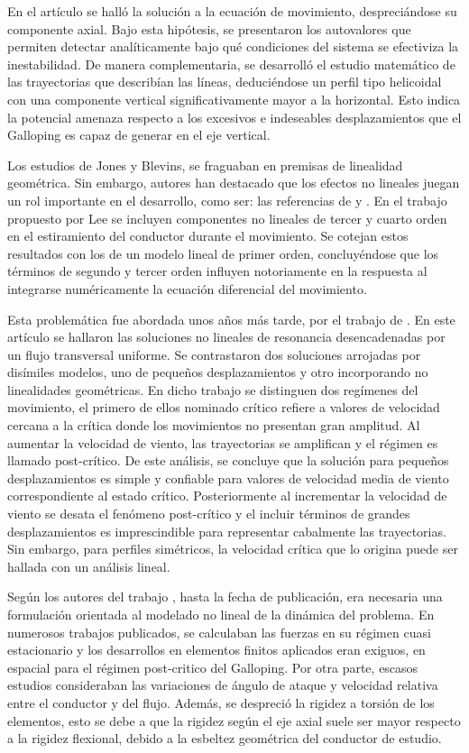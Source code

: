 En el artículo \citep{jones1992coupled} se halló la solución a la ecuación de movimiento, despreciándose su componente axial. Bajo esta hipótesis, se presentaron los autovalores que permiten detectar analíticamente bajo qué condiciones del sistema se efectiviza la inestabilidad. De manera complementaria, se desarrolló el estudio matemático de las trayectorias que describían las líneas, deduciéndose un perfil tipo helicoidal con una componente vertical significativamente mayor a la horizontal. Esto indica la potencial amenaza respecto a los excesivos e indeseables desplazamientos que el Galloping es capaz de generar en el eje vertical. 

Los estudios de Jones y Blevins, se fraguaban en premisas de linealidad geométrica. Sin embargo, autores han destacado que los efectos no lineales juegan un rol importante en el desarrollo, como ser: las referencias de \cite{luongo1984planar} y \cite{lee1992nonlinear}. En el trabajo propuesto por Lee se incluyen componentes no lineales de tercer y cuarto orden en el estiramiento del conductor durante el movimiento. Se cotejan estos resultados con los de un modelo lineal de primer orden, concluyéndose que los términos de segundo y tercer orden influyen notoriamente en la respuesta al integrarse numéricamente la ecuación diferencial del movimiento. 

Esta problemática fue abordada unos años más tarde, por el trabajo de \cite{luongo1998non}. En este artículo se hallaron las soluciones no lineales de resonancia desencadenadas por un flujo transversal uniforme. 
Se contrastaron dos soluciones arrojadas por disímiles modelos, uno de pequeños desplazamientos y otro incorporando no linealidades geométricas. En dicho trabajo se distinguen dos regímenes del movimiento, el primero de ellos nominado crítico refiere a valores de velocidad cercana a la crítica donde los movimientos no presentan gran amplitud. Al aumentar la velocidad de viento, las trayectorias se amplifican y el régimen es llamado post-crítico. De este análisis, se concluye que la solución para pequeños desplazamientos es simple y confiable para valores de velocidad media de viento correspondiente al estado crítico. Posteriormente al incrementar la velocidad de viento se desata el fenómeno post-crítico y el incluir términos de grandes desplazamientos es imprescindible para representar cabalmente las trayectorias. Sin embargo, para perfiles simétricos, la velocidad crítica que lo origina puede ser hallada con un análisis lineal.

Según los autores del trabajo \citep{luongo2007linear}, hasta la fecha de publicación, era necesaria una formulación orientada al modelado no lineal de la dinámica del problema. En numerosos trabajos publicados, se calculaban las fuerzas en su régimen cuasi estacionario y los desarrollos en elementos finitos aplicados eran exiguos, en espacial para el régimen post-critico del Galloping. Por otra parte, escasos estudios consideraban las variaciones de ángulo de ataque y velocidad relativa entre el conductor y del flujo. Además, se despreció la rigidez a torsión de los elementos, esto se debe a que la rigidez según el eje axial suele ser mayor respecto a la rigidez flexional, debido a la esbeltez geométrica del conductor de estudio.  

